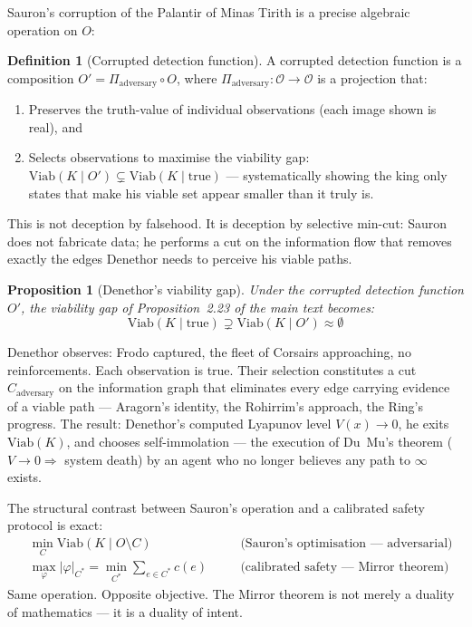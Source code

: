 \documentclass[11pt,a4paper]{article}
\newtheorem{proposition}[theorem]{Proposition}
\theoremstyle{definition}
\newtheorem{definition}[theorem]{Definition}
\theoremstyle{remark}
\newcommand{\Viab}{\mathrm{Viab}}
\begin{document}
Sauron's corruption of the Palantir of Minas Tirith is a precise algebraic operation on $O$:

\begin{definition}[Corrupted detection function]\label{def:corrupted}
A corrupted detection function is a composition $O' = \Pi_{\text{adversary}} \circ O$, where $\Pi_{\text{adversary}}: \mathcal{O} \to \mathcal{O}$ is a projection that:
\begin{enumerate}[nosep]
\item Preserves the truth-value of individual observations (each image shown is real), and
\item Selects observations to maximise the viability gap: $\Viab(K \mid O') \subsetneq \Viab(K \mid \text{true})$ --- systematically showing the king only states that make his viable set appear smaller than it truly is.
\end{enumerate}
\end{definition}

This is not deception by falsehood. It is deception by selective min-cut: Sauron does not fabricate data; he performs a cut on the information flow that removes exactly the edges Denethor needs to perceive his viable paths.

\begin{proposition}[Denethor's viability gap]\label{prop:denethor}
Under the corrupted detection function $O'$, the viability gap of Proposition~2.23 of the main text becomes:
\[
  \Viab(K \mid \text{true}) \supsetneq \Viab(K \mid O') \approx \emptyset
\]
\end{proposition}

Denethor observes: Frodo captured, the fleet of Corsairs approaching, no reinforcements. Each observation is true. Their selection constitutes a cut $C_{\text{adversary}}$ on the information graph that eliminates every edge carrying evidence of a viable path --- Aragorn's identity, the Rohirrim's approach, the Ring's progress. The result: Denethor's computed Lyapunov level $V(x) \to 0$, he exits $\Viab(K)$, and chooses self-immolation --- the execution of Du~Mu's theorem ($V \to 0 \Rightarrow$ system death) by an agent who no longer believes any path to $\infty$ exists.

The structural contrast between Sauron's operation and a calibrated safety protocol is exact:
\begin{align*}
  &\min_{C} \Viab(K \mid O \setminus C) \quad &&\text{(Sauron's optimisation --- adversarial)} \\
  &\max_\varphi |\varphi|_{C^*} = \min_{C^*} \sum_{e \in C^*} c(e) \quad &&\text{(calibrated safety --- Mirror theorem)}
\end{align*}
Same operation. Opposite objective. The Mirror theorem is not merely a duality of mathematics --- it is a duality of intent.
\end{document}
